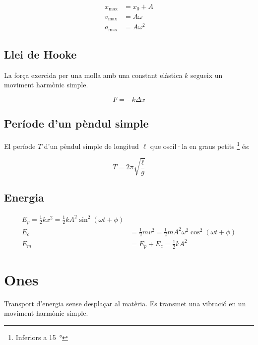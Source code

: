 \begin{align}
    x_\mathrm{max} &= x_0 + A \\
    v_\mathrm{max} &= A\omega \\
    a_\mathrm{max} &= A\omega^2
\end{align}

\subsection{Llei de Hooke}
\label{sub:llei_de_hooke}

La força exercida per una molla amb una constant elàstica $k$ segueix un
moviment harmònic simple.

\begin{equation}
    F = -k\Delta x
\end{equation}

\subsection{Període d'un pèndul simple}
\label{sub:periode_d_un_pendul_simple}

El període $T$ d'un pèndul simple de longitud $\ell$ que oscil·la en graus petits \footnote{Inferiors a \SI{15}{\degree}} és:

\begin{equation}
    T=2\pi\sqrt{\frac{\ell}{g}}
\end{equation}

\subsection{Energia}
\label{sub:energia}

\begin{align}
    E_p = \frac{1}{2}kx^2 = \frac{1}{2}kA^2\sin^2\left(\omega t + \phi\right) \\
    E_c &= \frac{1}{2}mv^2 = \frac{1}{2}mA^2\omega^2\cos^2\left(\omega t + \phi\right) \\
    E_m &= E_p + E_c = \frac{1}{2}kA^2
\end{align}

\section{Ones}
\label{sec:ones}

Transport d'energia sense desplaçar al matèria. Es transmet una vibració en un
moviment harmònic simple.

